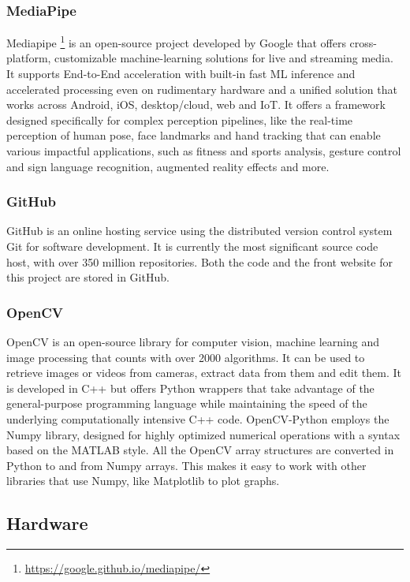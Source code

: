 \subsubsection{MediaPipe}
\label{subsec:mediapipe}
Mediapipe \footnote{\url{https://google.github.io/mediapipe/}} is an open-source project developed by Google that offers cross-platform, customizable machine-learning solutions for live and streaming media.
It supports End-to-End acceleration with built-in fast ML inference and accelerated processing even on rudimentary hardware and a unified solution that works across Android, iOS, desktop/cloud, web and IoT.
It offers a framework designed specifically for complex perception pipelines, like the real-time perception of human pose, face landmarks and hand tracking that can enable various impactful applications, such as fitness and sports analysis, gesture control and sign language recognition, augmented reality effects and more.


\subsubsection{GitHub}
\label{subsec:github}
GitHub is an online hosting service using the distributed version control system Git for software development. It is currently the most significant source code host, with over 350 million repositories.
Both the code and the front website for this project are stored in GitHub.


\subsubsection{OpenCV}
\label{subsec:opencv}
OpenCV is an open-source library for computer vision, machine learning and image processing that counts with over 2000 algorithms. 
It can be used to retrieve images or videos from cameras, extract data from them and edit them.
It is developed in C++ but offers Python wrappers that take advantage of the general-purpose programming language while maintaining the speed of the underlying computationally intensive C++ code.
OpenCV-Python employs the Numpy library, designed for highly optimized numerical operations with a syntax based on the MATLAB style.
All the OpenCV array structures are converted in Python to and from Numpy arrays. 
This makes it easy to work with other libraries that use Numpy, like Matplotlib to plot graphs.


\subsection{Hardware}
